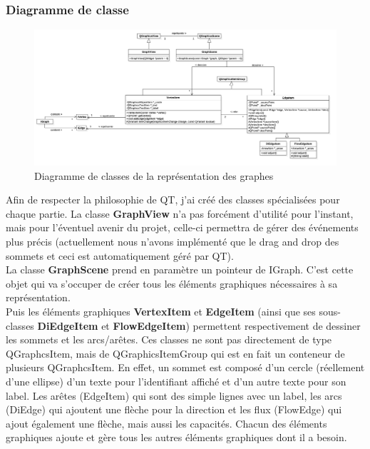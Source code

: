 \documentclass[french]{article}
\begin{document}
			\subsubsection{Diagramme de classe}
				\begin{figure}[H]
					\centering
					\includegraphics[width=0.9\textheight,angle=90]{Conception/visualization/visualization.png}
					\caption{Diagramme de classes de la représentation des graphes}
				\end{figure}
				
				\pagebreak
				
				Afin de respecter la philosophie de QT, j'ai créé des classes spécialisées pour chaque partie. La classe \textbf{GraphView} n'a pas forcément d'utilité pour l'instant, mais pour l'éventuel avenir du projet, celle-ci permettra de gérer des événements plus précis (actuellement nous n'avons implémenté que le drag and drop des sommets et ceci est automatiquement géré par QT). \\
				La classe \textbf{GraphScene} prend en paramètre un pointeur de IGraph. C'est cette objet qui va s'occuper de créer tous les éléments graphiques nécessaires à sa représentation. \\
				Puis les éléments graphiques \textbf{VertexItem} et \textbf{EdgeItem} (ainsi que ses sous-classes \textbf{DiEdgeItem} et \textbf{FlowEdgeItem}) permettent respectivement de dessiner les sommets et les arcs/arêtes. Ces classes ne sont pas directement de type QGraphcsItem, mais de QGraphicsItemGroup qui est en fait un conteneur de plusieurs QGraphcsItem. En effet, un sommet est composé d'un cercle (réellement d'une ellipse) d'un texte pour l'identifiant affiché et d'un autre texte pour son label. Les arêtes (EdgeItem) qui sont des simple lignes avec un label, les arcs (DiEdge) qui ajoutent une flèche pour la direction et les flux (FlowEdge) qui ajout également une flèche, mais aussi les capacités. Chacun des éléments graphiques ajoute et gère tous les autres éléments graphiques dont il a besoin. \\
				
\end{document}
